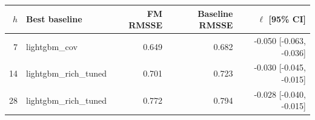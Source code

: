 \begin{tabular}{rlrrr}
\toprule
$h$ & Best baseline & FM RMSSE & Baseline RMSSE & $\ell$ [95\% CI] \\
\midrule
7 & lightgbm\_cov & 0.649 & 0.682 & -0.050 [-0.063, -0.036] \\
14 & lightgbm\_rich\_tuned & 0.701 & 0.723 & -0.030 [-0.045, -0.015] \\
28 & lightgbm\_rich\_tuned & 0.772 & 0.794 & -0.028 [-0.040, -0.015] \\
\bottomrule
\end{tabular}
